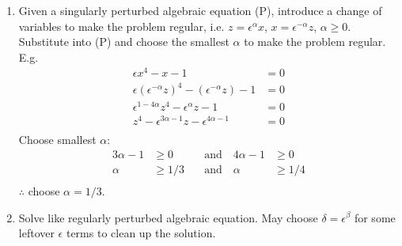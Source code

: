 \item[Singularly Perturbed w/ Algebraic Solutions] \hfill
  \begin{enumerate}
  \item Given a singularly perturbed algebraic equation (P), introduce a change
    of variables to make the problem regular, i.e. $z=\epsilon^\alpha x$,
    $x=\epsilon^{-\alpha}z$, $\alpha\ge0$. Substitute into (P) and choose the
    smallest $\alpha$ to make the problem regular. E.g.
    \begin{align*}
      \epsilon x^4-x-1&=0 \\
      \epsilon{(\epsilon^{-\alpha}z)}^4-(\epsilon^{-\alpha}z)-1&=0 \\
      \epsilon^{1-4\alpha}z^4-\epsilon^{\alpha}z-1&=0 \\
      z^4-\epsilon^{3\alpha-1}z-\epsilon^{4\alpha-1}&=0 \\
    \end{align*}
    Choose smallest $\alpha$:
    \begin{align*}
      3\alpha-1&\ge0 \quad&\text{and}\quad 4\alpha-1&\ge0 \\
      \alpha&\ge1/3 \quad&\text{and}\quad \alpha&\ge1/4 \\
    \end{align*}
    $\therefore$ choose $\alpha=1/3$.
  \item Solve like regularly perturbed algebraic equation. May choose
    $\delta=\epsilon^{\beta}$ for some leftover $\epsilon$ terms to clean up the
    solution.
  \end{enumerate}

